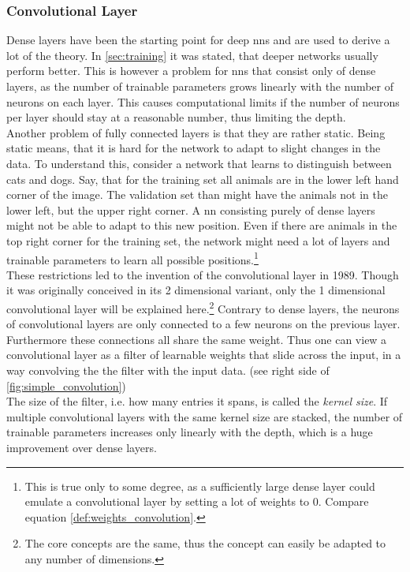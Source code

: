 \subsubsection{Convolutional Layer}\label{sec:convolution_layer}
Dense layers have been the starting point for deep \gls{nns} and are used to derive a lot of the theory. In \autoref{sec:training} it was stated, that deeper networks usually perform better. This is however a problem for \gls{nns} that consist only of dense layers, as the number of trainable parameters grows linearly with the number of neurons on each layer. This causes computational limits if the number of neurons per layer should stay at a reasonable number, thus limiting the depth.\\
Another problem of fully connected layers is that they are rather static. Being static means, that it is hard for the network to adapt to slight changes in the data. To understand this, consider a network that learns to distinguish between cats and dogs. Say, that for the training set all animals are in the lower left hand corner of the image. The validation set than might have the animals not in the lower left, but the upper right corner. A \gls{nn} consisting purely of dense layers might not be able to adapt to this new position. Even if there are animals in the top right corner for the training set, the network might need a lot of layers and trainable parameters to learn all possible positions.\footnote{This is true only to some degree, as a sufficiently large dense layer could emulate a convolutional layer by setting a lot of weights to 0. Compare equation \eqref{def:weights_convolution}.}\\
These restrictions led to the invention of the convolutional layer in 1989. \cite{convolution_layer_invention} Though it was originally conceived in its 2 dimensional variant, only the 1 dimensional convolutional layer will be explained here.\footnote{The core concepts are the same, thus the concept can easily be adapted to any number of dimensions.} Contrary to dense layers, the neurons of convolutional layers are only connected to a few neurons on the previous layer. Furthermore these connections all share the same weight. Thus one can view a convolutional layer as a filter of learnable weights that slide across the input, in a way convolving the the filter with the input data. (see right side of \autoref{fig:simple_convolution})\\
The size of the filter, i.e. how many entries it spans, is called the \emph{kernel size}. If multiple convolutional layers with the same kernel size are stacked, the number of trainable parameters increases only linearly with the depth, which is a huge improvement over dense layers.\\

